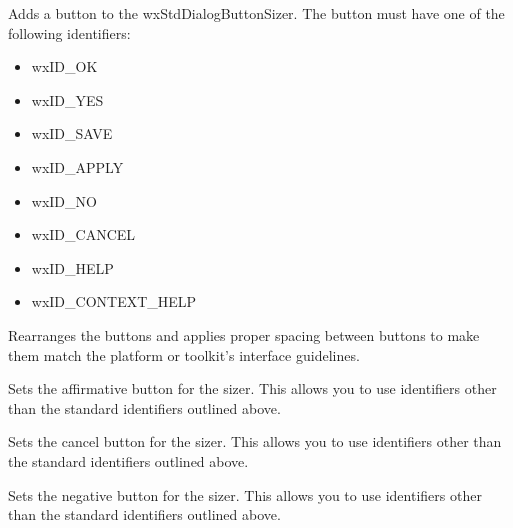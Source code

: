 Adds a button to the wxStdDialogButtonSizer. The button must have one of the following identifiers:

\begin{itemize}\itemsep=0pt
\item wxID\_OK
\item wxID\_YES
\item wxID\_SAVE
\item wxID\_APPLY
\item wxID\_NO
\item wxID\_CANCEL
\item wxID\_HELP
\item wxID\_CONTEXT\_HELP
\end{itemize}

\label{wxstddialogbuttonsizerfinalise}


Rearranges the buttons and applies proper spacing between buttons to make them match the platform or toolkit's interface guidelines.

\label{wxstddialogbuttonsizersetaffirmativebutton}


Sets the affirmative button for the sizer. This allows you to use identifiers other than the standard identifiers outlined above.

\label{wxstddialogbuttonsizersetcancelbutton}


Sets the cancel button for the sizer. This allows you to use identifiers other than the standard identifiers outlined above.

\label{wxstddialogbuttonsizersetnegativebutton}


Sets the negative button for the sizer. This allows you to use identifiers other than the standard identifiers outlined above.

